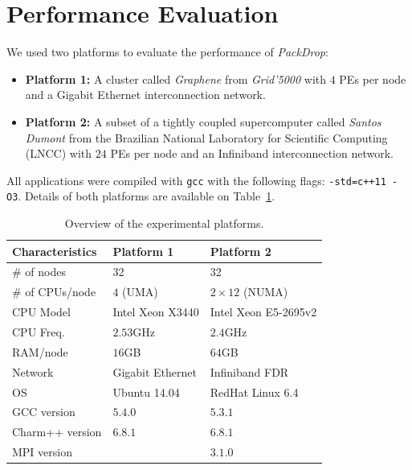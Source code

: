 \section{Performance Evaluation} \label{sec:eval}

We used two platforms to evaluate the performance of \textit{PackDrop}:

\begin{itemize}
	\item \textbf{Platform 1:} A cluster called \textit{Graphene} from \textit{Grid'5000} with $4$ PEs per node and  a Gigabit Ethernet interconnection network.
	\item \textbf{Platform 2:} A subset of a tightly coupled supercomputer called \textit{Santos Dumont} from the Brazilian National Laboratory for Scientific Computing (LNCC) with $24$ PEs per node and an Infiniband interconnection network.%
\end{itemize}

All applications were compiled with \texttt{gcc} with the following flags: \texttt{-std=c++11 -O3}. Details of both platforms are available on Table~\ref{tab:ptinfo}.


\begin{table}[t]
    \centering
    	\caption{Overview of the experimental platforms.}
	\begin{tabular}{lll}
	\toprule
	\textbf{Characteristics}	& \textbf{Platform 1} 		& \textbf{Platform 2}	\\
	\midrule
	\# of nodes	   		& 32 					& 32 \\
        \# of CPUs/node	   	& $4$ (UMA) 			& $2\times12$ (NUMA) \\
        CPU Model			& Intel Xeon X3440 		& Intel Xeon E5-2695v2 \\
        CPU Freq.  			& $2.53$GHz			& $2.4$GHz \\
        RAM/node    			& $16$GB				& $64$GB	 \\
        Network 				& Gigabit Ethernet		& Infiniband FDR \\
        OS      				& Ubuntu 14.04			& RedHat Linux 6.4 \\
        GCC	version			& $5.4.0$				& $5.3.1$	\\
        Charm++ version		& $6.8.1$				& $6.8.1$ 	\\
        MPI version			& \tofix{???}			& $3.1.0$	\\
        \bottomrule
	\end{tabular}
    \label{tab:ptinfo}
\end{table}

